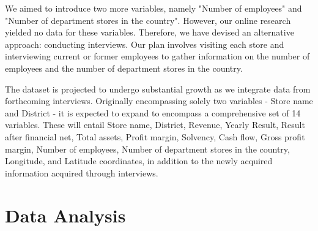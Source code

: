 We aimed to introduce two more variables, namely "Number of employees" and "Number of department stores in the country". However, our online research yielded no data for these variables. Therefore, we have devised an alternative approach: conducting interviews. Our plan involves visiting each store and interviewing current or former employees to gather information on the number of employees and the number of department stores in the country.

The dataset is projected to undergo substantial growth as we integrate data from forthcoming interviews. Originally encompassing solely two variables - Store name and District - it is expected to expand to encompass a comprehensive set of 14 variables. These will entail Store name, District, Revenue, Yearly Result, Result after financial net, Total assets, Profit margin, Solvency, Cash flow, Gross profit margin, Number of employees, Number of department stores in the country, Longitude, and Latitude coordinates, in addition to the newly acquired information acquired through interviews.

\section{Data Analysis}








